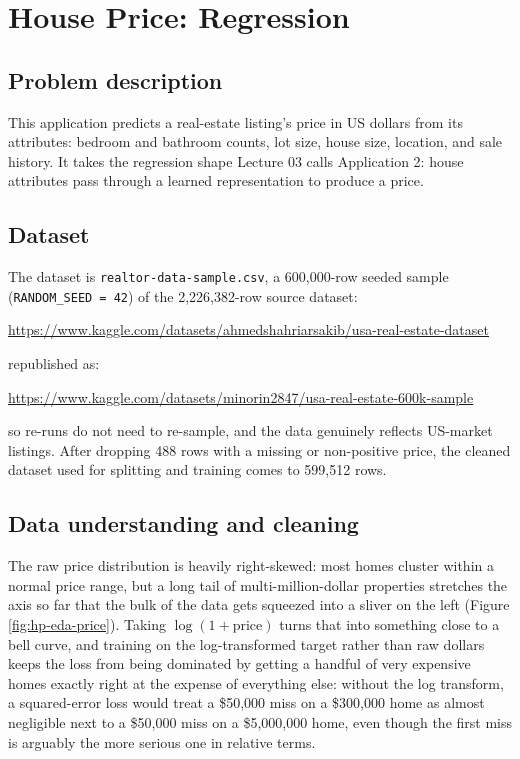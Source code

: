 \documentclass[11pt]{article}
\begin{document}
\section{House Price: Regression}
\label{sec:house_price}

\subsection{Problem description}

This application predicts a real-estate listing's price in US dollars from its attributes:
bedroom and bathroom counts, lot size, house size, location, and sale history. It takes the
regression shape Lecture 03 calls Application 2: house attributes pass through a learned
representation to produce a price.

\subsection{Dataset}

The dataset is \texttt{realtor-data-sample.csv}, a 600,000-row seeded sample
(\texttt{RANDOM\_SEED = 42}) of the 2,226,382-row source dataset:
\begin{center}
\small\url{https://www.kaggle.com/datasets/ahmedshahriarsakib/usa-real-estate-dataset}
\end{center}
republished as:
\begin{center}
\small\url{https://www.kaggle.com/datasets/minorin2847/usa-real-estate-600k-sample}
\end{center}
so re-runs do not need to re-sample, and the data genuinely reflects US-market listings.
After dropping 488 rows with a missing or non-positive price, the cleaned dataset used for
splitting and training comes to 599,512 rows.

\subsection{Data understanding and cleaning}

The raw price distribution is heavily right-skewed: most homes cluster within a normal
price range, but a long tail of multi-million-dollar properties stretches the axis so far
that the bulk of the data gets squeezed into a sliver on the left (Figure
\ref{fig:hp-eda-price}). Taking $\log(1+\text{price})$ turns that into something close to a
bell curve, and training on the log-transformed target rather than raw dollars keeps the
loss from being dominated by getting a handful of very expensive homes exactly right at the
expense of everything else: without the log transform, a squared-error loss would treat a
\$50,000 miss on a \$300,000 home as almost negligible next to a \$50,000 miss on a
\$5,000,000 home, even though the first miss is arguably the more serious one in relative
terms.
\end{document}
